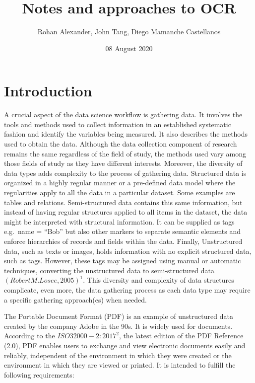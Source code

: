 \documentclass[
]{article}
\title{Notes and approaches to OCR}
\author{Rohan Alexander, John Tang, Diego Mamanche Castellanos}
\date{08 August 2020}
\begin{document}
\maketitle

\hypertarget{introduction}{%
\section{Introduction}\label{introduction}}

A crucial aspect of the data science workflow is gathering data. It
involves the tools and methods used to collect information in an
established systematic fashion and identify the variables being
measured. It also describes the methods used to obtain the data.
Although the data collection component of research remains the same
regardless of the field of study, the methods used vary among those
fields of study as they have different interests. Moreover, the
diversity of data types adds complexity to the process of gathering
data. Structured data is organized in a highly regular manner or a
pre-defined data model where the regularities apply to all the data in a
particular dataset. Some examples are tables and relations.
Semi-structured data contains this same information, but instead of
having regular structures applied to all items in the dataset, the data
might be interpreted with structural information. It can be supplied as
tags e.g.~name = ``Bob'' but also other markers to separate semantic
elements and enforce hierarchies of records and fields within the data.
Finally, Unstructured data, such as texts or images, holds information
with no explicit structured data, such as tags. However, these tags may
be assigned using manual or automatic techniques, converting the
unstructured data to semi-structured data \((Robert M. Losee, 2005)^1\).
This diversity and complexity of data structures complicate, even more,
the data gathering process as each data type may require a specific
gathering approach(es) when needed.

The Portable Document Format (PDF) is an example of unstructured data
created by the company Adobe in the 90s. It is widely used for
documents. According to the \(ISO 32000-2:2017^2\), the latest edition
of the PDF Reference (2.0), PDF enables users to exchange and view
electronic documents easily and reliably, independent of the environment
in which they were created or the environment in which they are viewed
or printed. It is intended to fulfill the following requirements:
\end{document}
